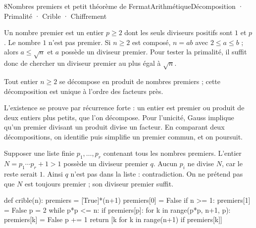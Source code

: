 \begin{ouverture}[denombrement]{8}{Nombres premiers et petit théorème de Fermat}{Arithmétique}{Décomposition · Primalité · Crible · Chiffrement}
\end{ouverture}
\essentiel

Un nombre premier est un entier $p\geq2$ dont les seuls diviseurs positifs sont $1$ et $p$. Le nombre $1$ n'est pas premier.
Si $n\geq2$ est composé, $n=ab$ avec $2\leq a\leq b$ ; alors $a\leq\sqrt n$ et $a$ possède un diviseur premier. Pour tester la primalité, il suffit donc de chercher un diviseur premier au plus égal à $\sqrt n$.
\begin{theoreme}
Tout entier $n\geq2$ se décompose en produit de nombres premiers ; cette décomposition est unique à l'ordre des facteurs près.
\end{theoreme}
L'existence se prouve par récurrence forte : un entier est premier ou produit de deux entiers plus petits, que l'on décompose.
Pour l'unicité, Gauss implique qu'un premier divisant un produit divise un facteur. En comparant deux décompositions, on identifie puis simplifie un premier commun, et on poursuit.
\begin{demonstration}
Supposer une liste finie $p_1,\ldots,p_r$ contenant tous les nombres premiers.
L'entier $N=p_1\cdots p_r+1>1$ possède un diviseur premier $q$.
Aucun $p_i$ ne divise $N$, car le reste serait $1$. Ainsi $q$ n'est pas dans la liste : contradiction.
On ne prétend pas que $N$ est toujours premier ; son diviseur premier suffit.
\end{demonstration}
\begin{python}
def crible(n):
    premiers = [True]*(n+1)
    premiers[0] = False
    if n >= 1: premiers[1] = False
    p = 2
    while p*p <= n:
        if premiers[p]:
            for k in range(p*p, n+1, p):
                premiers[k] = False
        p += 1
    return [k for k in range(n+1) if premiers[k]]
\end{python}
